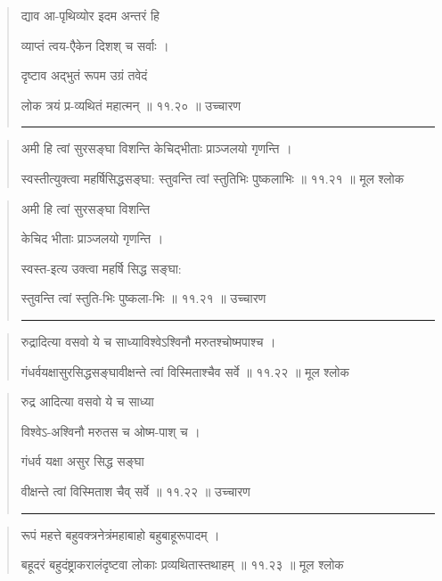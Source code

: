 \begin{quotation}

द्याव आ-पृथिव्योर इदम अन्तरं हि

व्याप्तं त्वय-एैकेन दिशश् च सर्वाः  ।  

दृष्टाव अद्भुतं रूपम उग्रं तवेदं 

लोक त्रयं प्र-व्यथितं महात्मन्‌  ॥ ११.२० ॥  उच्चारण

\noindent\rule{16cm}{0.4pt} 
\end{quotation}


\begin{quotation} 

अमी हि त्वां सुरसङ्‍घा विशन्ति केचिद्भीताः प्राञ्जलयो गृणन्ति ।  

स्वस्तीत्युक्त्वा महर्षिसिद्धसङ्‍घा: स्तुवन्ति त्वां स्तुतिभिः पुष्कलाभिः  ॥ ११.२१ ॥  मूल श्लोक
\end{quotation}

\begin{quotation}

अमी हि त्वां सुरसङ्‍घा विशन्ति 

केचिद भीताः प्राञ्जलयो गृणन्ति ।  

स्वस्त-इत्य उक्त्वा महर्षि सिद्ध सङ्‍घा: 

स्तुवन्ति त्वां स्तुति-भिः पुष्कला-भिः  ॥ ११.२१ ॥  उच्चारण

\noindent\rule{16cm}{0.4pt} 
\end{quotation}


\begin{quotation} 

रुद्रादित्या वसवो ये च साध्याविश्वेऽश्विनौ मरुतश्चोष्मपाश्च  ।  

गंधर्वयक्षासुरसिद्धसङ्‍घावीक्षन्ते त्वां विस्मिताश्चैव सर्वे  ॥ ११.२२ ॥  मूल श्लोक
\end{quotation}

\begin{quotation}

रुद्र आदित्या वसवो ये च साध्या 

विश्वेऽ-अश्विनौ मरुतस च ओष्म-पाश् च ।  

गंधर्व यक्षा असुर सिद्ध सङ्‍घा 

वीक्षन्ते त्वां विस्मिताश चैव् सर्वे  ॥ ११.२२ ॥  उच्चारण

\noindent\rule{16cm}{0.4pt} 
\end{quotation}


\begin{quotation} 

रूपं महत्ते बहुवक्त्रनेत्रंमहाबाहो बहुबाहूरूपादम्‌  ।  

बहूदरं बहुदंष्ट्राकरालंदृष्टवा लोकाः प्रव्यथितास्तथाहम्‌  ॥ ११.२३ ॥  मूल श्लोक
\end{quotation}

